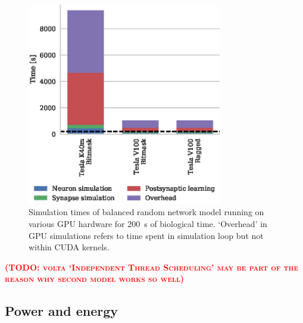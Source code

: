 \documentclass[utf8]{frontiersSCNS} %
\newcommand{\todo}[1]{\textbf{\textsc{\textcolor{red}{(TODO: #1)}}}}
\begin{document}
\begin{figure}
    \begin{center}
        \includegraphics[width=85mm]{figures/stdp_performance}
    \end{center}
    \caption{Simulation times of balanced random network model running on various GPU hardware for \SI{200}{\second} of biological time.
    `Overhead' in GPU simulations refers to time spent in simulation loop but not within CUDA kernels.}
    \label{fig:stdp_performance}
\end{figure}

\todo{volta `Independent Thread Scheduling' may be part of the reason why second model works so well}

\subsection{Power and energy}
\end{document}
